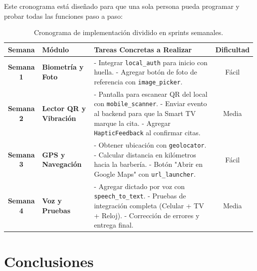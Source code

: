 \documentclass[11pt,a4paper]{article}
\begin{document}
Este cronograma está diseñado para que una sola persona pueda programar y probar todas las funciones paso a paso:

\begin{table}[h!]
\centering
\small
\begin{tabularx}{\textwidth}{c l p{7cm} c}
\toprule
\textbf{Semana} & \textbf{Módulo} & \textbf{Tareas Concretas a Realizar} & \textbf{Dificultad} \\
\midrule
\textbf{Semana 1} & \textbf{Biometría y Foto} & 
- Integrar \texttt{local\_auth} para inicio con huella.\newline
- Agregar botón de foto de referencia con \texttt{image\_picker}. & Fácil \\[0.5cm]

\textbf{Semana 2} & \textbf{Lector QR y Vibración} & 
- Pantalla para escanear QR del local con \texttt{mobile\_scanner}.\newline
- Enviar evento al backend para que la Smart TV marque la cita.\newline
- Agregar \texttt{HapticFeedback} al confirmar citas. & Media \\[0.5cm]

\textbf{Semana 3} & \textbf{GPS y Navegación} & 
- Obtener ubicación con \texttt{geolocator}.\newline
- Calcular distancia en kilómetros hacia la barbería.\newline
- Botón "Abrir en Google Maps" con \texttt{url\_launcher}. & Fácil \\[0.5cm]

\textbf{Semana 4} & \textbf{Voz y Pruebas} & 
- Agregar dictado por voz con \texttt{speech\_to\_text}.\newline
- Pruebas de integración completa (Celular + TV + Reloj).\newline
- Corrección de errores y entrega final. & Media \\
\bottomrule
\end{tabularx}
\caption{Cronograma de implementación dividido en sprints semanales.}
\end{table}

\section{Conclusiones}
\end{document}
